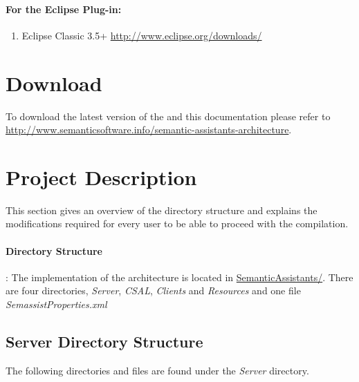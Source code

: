 \paragraph{For the Eclipse Plug-in:}
\begin{enumerate}
\item Eclipse Classic 3.5+ \url{http://www.eclipse.org/downloads/}
\end{enumerate}

\section{Download}
To download the latest version of the \sa and this documentation
please refer to
\url{http://www.semanticsoftware.info/semantic-assistants-architecture}.

\section{Project Description}
This section gives an overview of the directory structure and explains the modifications
required for every user to be able to proceed with the compilation.

\paragraph{Directory Structure}:
The implementation of the architecture is located in
\url{SemanticAssistants/}. There are four directories, \emph{Server},
\emph{CSAL}, \emph{Clients} and \emph{Resources} and one file \emph{SemassistProperties.xml}

\subsection{Server Directory Structure}
The following directories and files are found under the \emph{Server} directory.

